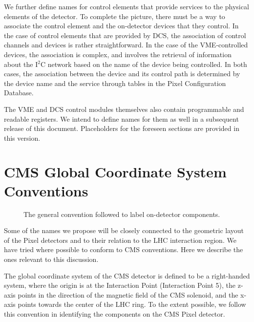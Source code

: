 \documentclass{cmspaper}
\begin{document}
We further define names for control elements that provide 
services  to the 
physical elements of the detector. To complete the picture, there must
be a way to associate the control element and the on-detector devices that 
they control.
In the case of control elements  that
are provided by DCS, the association of control channels and devices 
is rather 
straightforward. In the case of the VME-controlled devices, the association 
is complex, and involves the retrieval of information about 
the I$^{2}$C network based on the name of the device being controlled.  
In both cases, the association between the  device and its control 
path is determined by the device name and the service through tables in the
Pixel Configuration Database.

The VME and DCS control modules themselves also contain programmable and 
readable registers. We intend to define names for them as well in a
subsequent release of this document. Placeholders for the foreseen sections 
are provided in this version.



\section{CMS Global Coordinate System Conventions}

\begin{figure}[hbtp]
  \begin{center}
    \caption{The general convention followed to label on-detector components.}
    \label{figure:convention}
  \end{center}
\end{figure}

Some of the names we propose will be closely connected to the geometric
layout of
the Pixel detectors and to their relation to the LHC interaction region. 
We have tried where possible to conform to
CMS conventions. Here we describe the ones relevant to this discussion. 

The global coordinate system of the CMS detector is defined to be a 
right-handed system, where the origin is 
at the Interaction Point (Interaction Point 5), 
the z-axis points in the direction of 
the magnetic field of the CMS solenoid, and the x-axis points towards
the center of the LHC ring. 
To the extent possible, we follow this convention in  identifying the 
components on the CMS Pixel detector.
\end{document}
